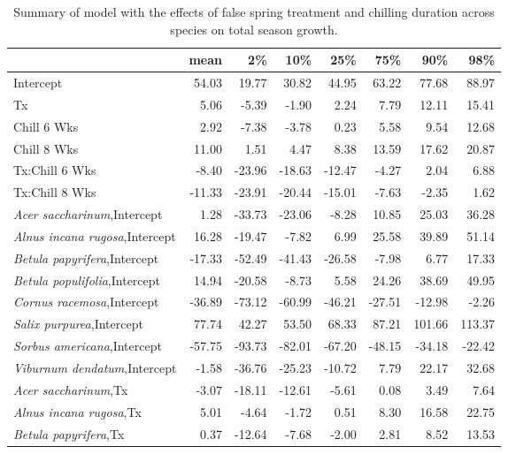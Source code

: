 \documentclass{article}\usepackage[]{graphicx}\usepackage[]{color}
\begin{document}
\newpage
\begin{longtable}{lrrrrrrr}
\caption{Summary of model with the effects of false spring treatment and chilling duration across species on total season growth.} \\ 
  \hline
 & mean & 2\% & 10\% & 25\% & 75\% & 90\% & 98\% \\ 
  \hline \endhead  \hline
Intercept & 54.03 & 19.77 & 30.82 & 44.95 & 63.22 & 77.68 & 88.97 \\ 
  Tx & 5.06 & -5.39 & -1.90 & 2.24 & 7.79 & 12.11 & 15.41 \\ 
  Chill 6 Wks & 2.92 & -7.38 & -3.78 & 0.23 & 5.58 & 9.54 & 12.68 \\ 
  Chill 8 Wks & 11.00 & 1.51 & 4.47 & 8.38 & 13.59 & 17.62 & 20.87 \\ 
  Tx:Chill 6 Wks & -8.40 & -23.96 & -18.63 & -12.47 & -4.27 & 2.04 & 6.88 \\ 
  Tx:Chill 8 Wks & -11.33 & -23.91 & -20.44 & -15.01 & -7.63 & -2.35 & 1.62 \\ 
  \textit{Acer saccharinum},Intercept & 1.28 & -33.73 & -23.06 & -8.28 & 10.85 & 25.03 & 36.28 \\ 
  \textit{Alnus incana rugosa},Intercept & 16.28 & -19.47 & -7.82 & 6.99 & 25.58 & 39.89 & 51.14 \\ 
  \textit{Betula papyrifera},Intercept & -17.33 & -52.49 & -41.43 & -26.58 & -7.98 & 6.77 & 17.33 \\ 
  \textit{Betula populifolia},Intercept & 14.94 & -20.58 & -8.73 & 5.58 & 24.26 & 38.69 & 49.95 \\ 
  \textit{Cornus racemosa},Intercept & -36.89 & -73.12 & -60.99 & -46.21 & -27.51 & -12.98 & -2.26 \\ 
  \textit{Salix purpurea},Intercept & 77.74 & 42.27 & 53.50 & 68.33 & 87.21 & 101.66 & 113.37 \\ 
  \textit{Sorbus americana},Intercept & -57.75 & -93.73 & -82.01 & -67.20 & -48.15 & -34.18 & -22.42 \\ 
  \textit{Viburnum dendatum},Intercept & -1.58 & -36.76 & -25.23 & -10.72 & 7.79 & 22.17 & 32.68 \\ 
  \textit{Acer saccharinum},Tx & -3.07 & -18.11 & -12.61 & -5.61 & 0.08 & 3.49 & 7.64 \\ 
  \textit{Alnus incana rugosa},Tx & 5.01 & -4.64 & -1.72 & 0.51 & 8.30 & 16.58 & 22.75 \\ 
  \textit{Betula papyrifera},Tx & 0.37 & -12.64 & -7.68 & -2.00 & 2.81 & 8.52 & 13.53 \\ 

\end{longtable}
\end{document}
